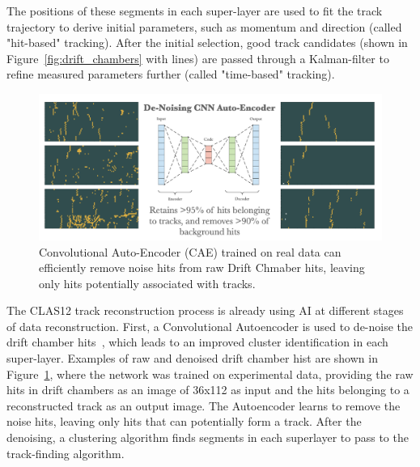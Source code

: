 \documentclass{webofc}
\begin{document}
The positions of these segments in each super-layer are used to fit the track trajectory 
to derive initial parameters, such as momentum and direction (called "hit-based" tracking).  After the initial selection, good track candidates 
(shown in Figure~\ref{fig:drift_chambers} with lines) are passed through a Kalman-filter to 
refine measured parameters further (called "time-based" tracking).


\begin{figure}[h!]
\centering
\includegraphics[width=0.85\columnwidth]{images/denoise_autoencoder.png}
\caption{Convolutional Auto-Encoder (CAE) trained on real data can efficiently remove noise hits from raw Drift Chmaber hits, leaving only hits potentially associated with tracks. } 
\label{fig:denoising}
\end{figure}

The CLAS12 track reconstruction process is already using AI at different stages of data reconstruction. First, a Convolutional
Autoencoder is used to de-noise the drift chamber hits~\cite{Thomadakis:2022zcd}, which leads to an improved cluster
identification in each super-layer. Examples of raw and denoised drift chamber hist are shown in Figure~\ref{fig:denoising},
where the network was trained on experimental data, providing the raw hits in drift chambers as an image of 36x112 as input and
the hits belonging to a reconstructed track as an output image. The Autoencoder learns to remove the noise hits, leaving only 
hits that can potentially form a track. After the denoising, a clustering algorithm finds segments in each superlayer to 
pass to the track-finding algorithm.
\end{document}
